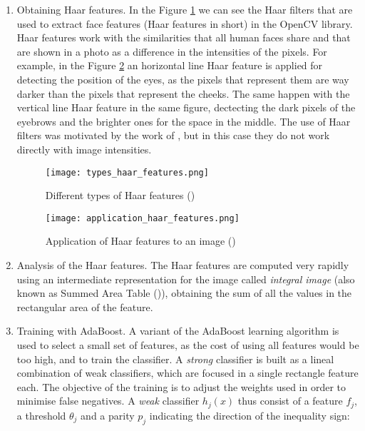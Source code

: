 	\begin{enumerate}
		\item Obtaining Haar features. In the Figure \ref{fig:haar_features} we can see the Haar filters that are used to extract face features (Haar features in short) in the OpenCV library. Haar features work with the similarities that all human faces share and that are shown in a photo as a difference in the intensities of the pixels. For example, in the Figure \ref{fig:application_haar_features} an horizontal line Haar feature is applied for detecting the position of the eyes, as the pixels that represent them are way darker than the pixels that represent the cheeks. The same happen with the vertical line Haar feature in the same figure, dectecting the dark pixels of the eyebrows and the brighter ones for the space in the middle. The use of Haar filters was motivated by the work of \cite{haar_features_before_vj}, but in this case they do not work directly with image intensities. 

		\begin{figure}[!ht]
			\centering
			\texttt{[image: types\_haar\_features.png]}
			\caption{Different types of Haar features (\cite{opencv_haar_cascade_tut})}
			\label{fig:haar_features}
		\end{figure}

		\begin{figure}[!ht]
			\centering
			\texttt{[image: application\_haar\_features.png]}
			\caption{Application of Haar features to an image (\cite{viola2001rapid})}
			\label{fig:application_haar_features}
		\end{figure}

		\item Analysis of the Haar features. The Haar features are computed very rapidly using an intermediate representation for the image called \textit{integral image} (also known as Summed Area Table (\cite{crow_summed_table})), obtaining the sum of all the values in the rectangular area of the feature. 

		\item Training with AdaBoost. A variant of the AdaBoost learning algorithm is used to select a small set of features, as the cost of using all features would be too high, and to train the classifier. A \textit{strong} classifier is built as a lineal combination of weak classifiers, which are focused in a single rectangle feature each. The objective of the training is to adjust the weights used in order to minimise false negatives. A \textit{weak} classifier $h_j(x)$ thus consist of a feature $f_j$, a threshold $\theta_j$ and a parity $p_j$ indicating the direction of the inequality sign:


\end{enumerate}
